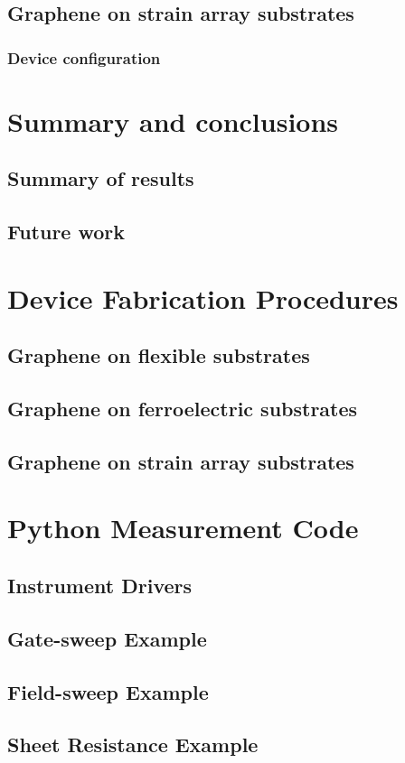 \documentclass[edeposit,fullpage,draftthesis]{uiucthesis2009}
\begin{document}
\section{Graphene on strain array substrates}
    \subsection{Device configuration}


\chapter{Summary and conclusions}
\section{Summary of results}
\section{Future work}

\begin{appendices}

\chapter{Device Fabrication Procedures}
\label{appendix:fab}
\section{Graphene on flexible substrates}
\section{Graphene on ferroelectric substrates}
\section{Graphene on strain array substrates}

\chapter{Python Measurement Code}
\section{Instrument Drivers}
\section{Gate-sweep Example}
\section{Field-sweep Example}
\section{Sheet Resistance Example}

\end{appendices}

\backmatter



\end{document}
